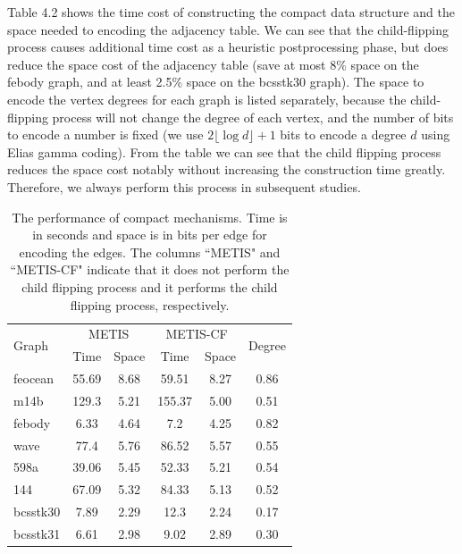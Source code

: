 \documentclass[12pt,glossary]{dalthesis}
\begin{document}
\bigskip
\bigskip


Table 4.2 shows the time cost of constructing the compact data structure and the space needed to encoding the adjacency table. We can see that the child-flipping process causes additional time cost as a heuristic postprocessing phase, but does reduce the space cost of the adjacency table (save at most 8\% space on the febody graph, and at least 2.5\% space on the bcsstk30 graph). The space to encode the vertex degrees for each graph is listed separately, because the child-flipping process will not change the degree of each vertex, and the number of bits to encode a number is fixed (we use $2\lfloor \log d \rfloor + 1$ bits to encode a degree $d$ using Elias gamma coding). From the table we can see that the child flipping process reduces the space cost notably without increasing the construction time greatly. Therefore, we always perform this process in subsequent studies. 

\begin{table}[]
\centering
\caption{The performance of compact mechanisms. Time is in seconds and space is in bits per edge for encoding the edges. The columns ``METIS" and ``METIS-CF" indicate that it does not perform the child flipping process and it performs the child flipping process, respectively.}
\label{compact-performance}
\begin{tabular}{|l||c|c||c|c||c|}
\cline{2-6}
\hline
\multirow{2}{*}{Graph} & \multicolumn{2}{c||}{METIS} & \multicolumn{2}{c||}{METIS-CF} & \multirow{2}{*}{Degree} \\ \cline{2-5}
                       & Time          & Space        & Time           & Space         &                         \\ \cline{6-6} \hline
feocean                & 55.69         & 8.68         & 59.51          & 8.27          & 0.86                    \\
m14b                   & 129.3         & 5.21         & 155.37         & 5.00          & 0.51                    \\
febody                 & 6.33          & 4.64         & 7.2            & 4.25          & 0.82                    \\
wave                   & 77.4          & 5.76         & 86.52          & 5.57          & 0.55                    \\
598a                   & 39.06         & 5.45         & 52.33          & 5.21          & 0.54                    \\
144                    & 67.09         & 5.32         & 84.33          & 5.13          & 0.52                    \\
bcsstk30               & 7.89          & 2.29         & 12.3           & 2.24          & 0.17                    \\
bcsstk31               & 6.61          & 2.98         & 9.02           & 2.89          & 0.30                    \\ \hline
\end{tabular}
\end{table}
\end{document}
